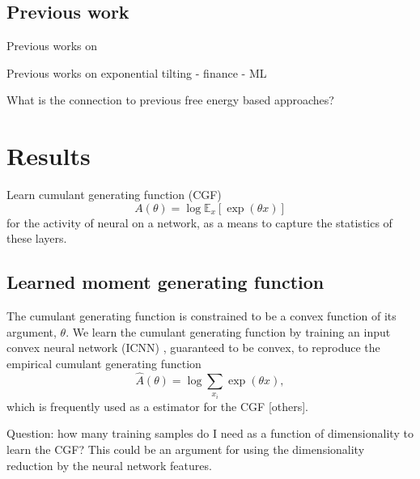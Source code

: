 \documentclass[10pt]{article}      %
\begin{document}
\subsection{Previous work}

Previous works on 

Previous works on exponential tilting
- finance
- ML

What is the connection to previous free energy based approaches?



\section{Results}

Learn cumulant generating function (CGF)
\begin{equation}
  A(\theta) = \log \mathbb{E}_x[\exp(\theta x)]
\end{equation}
for the activity of neural on a network, as a means to capture the statistics of these layers.


\subsection{Learned moment generating function}

The cumulant generating function is constrained to be a convex function of its argument, $\theta$.
We learn the cumulant generating function by training an input convex neural network (ICNN) \cite{amos_input_2017}, guaranteed to be convex, to reproduce the empirical cumulant generating function
\begin{equation}
  \hat A(\theta) = \log \sum_{x_i} \exp(\theta x),
\end{equation}
which is frequently used as a estimator for the CGF \cite{duffield_entropy_1995} [others]. 


Question: how many training samples do I need as a function of dimensionality to learn the CGF? This could be an argument for using the dimensionality reduction by the neural network features.
\end{document}
